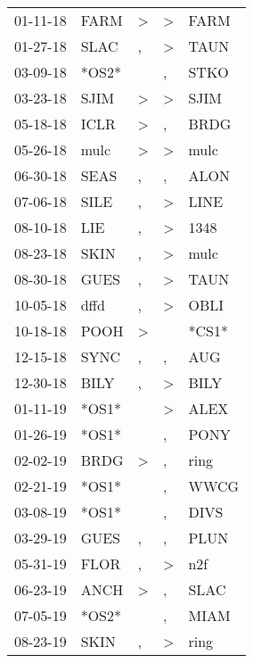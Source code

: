 \begin{supertabular}{lllll}
 01-11-18 &   FARM &  \textgreater &  \textgreater &   FARM \\
 01-27-18 &   SLAC &             , &  \textgreater &   TAUN \\
 03-09-18 &  *OS2* &               &             , &   STKO \\
 03-23-18 &   SJIM &  \textgreater &  \textgreater &   SJIM \\
 05-18-18 &   ICLR &  \textgreater &             , &   BRDG \\
 05-26-18 &   mulc &  \textgreater &  \textgreater &   mulc \\
 06-30-18 &   SEAS &             , &             , &   ALON \\
 07-06-18 &   SILE &             , &  \textgreater &   LINE \\
 08-10-18 &    LIE &             , &  \textgreater &   1348 \\
 08-23-18 &   SKIN &             , &  \textgreater &   mulc \\
 08-30-18 &   GUES &             , &  \textgreater &   TAUN \\
 10-05-18 &   dffd &             , &  \textgreater &   OBLI \\
 10-18-18 &   POOH &  \textgreater &               &  *CS1* \\
 12-15-18 &   SYNC &             , &             , &    AUG \\
 12-30-18 &   BILY &             , &  \textgreater &   BILY \\
 01-11-19 &  *OS1* &               &  \textgreater &   ALEX \\
 01-26-19 &  *OS1* &               &             , &   PONY \\
 02-02-19 &   BRDG &  \textgreater &             , &   ring \\
 02-21-19 &  *OS1* &               &             , &   WWCG \\
 03-08-19 &  *OS1* &               &             , &   DIVS \\
 03-29-19 &   GUES &             , &             , &   PLUN \\
 05-31-19 &   FLOR &             , &  \textgreater &    n2f \\
 06-23-19 &   ANCH &  \textgreater &             , &   SLAC \\
 07-05-19 &  *OS2* &               &             , &   MIAM \\
 08-23-19 &   SKIN &             , &  \textgreater &   ring \\

\end{supertabular}
